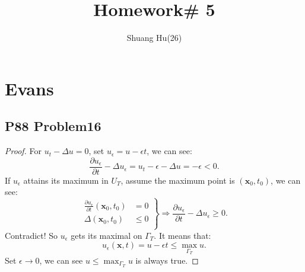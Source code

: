 \documentclass[a4paper]{ctexart}
\title{Homework\# 5}
\author{Shuang Hu(26)}
\newcommand{\pdfFrac}[2]{\frac{\partial #1}{\partial #2}}
\begin{document}
\maketitle
\section*{Evans}
\subsection*{P88 Problem16}
\begin{proof}
    For $u_{t}-\Delta u=0$, set $u_{\epsilon}=u-\epsilon t$, we can see:
    \begin{equation}
        \pdfFrac{u_{\epsilon}}{t}-\Delta u_{\epsilon}=u_{t}-\epsilon-\Delta u=-\epsilon<0.
    \end{equation}
    If $u_{\epsilon}$ attains its maximum in $U_{T}$, assume the maximum point is $(\mathbf{x}_{0},t_{0})$, we can see:
    \begin{equation}
        \left.
        \begin{aligned}
            \pdfFrac{u_{\epsilon}}{t}(\mathbf{x}_{0},t_{0})&=0\\
            \Delta(\mathbf{x}_{0},t_{0})&\le 0\\
        \end{aligned}
        \right\}
        \Rightarrow \pdfFrac{u_{\epsilon}}{t}-\Delta u_{\epsilon}\ge 0.
    \end{equation}
    Contradict! So $u_{\epsilon}$ gets its maximal on $\Gamma_{T}$. It means that:
    \begin{equation}
        u_{\epsilon}(\mathbf{x},t)=u-\epsilon t\le\max_{\Gamma_{T}}u.
    \end{equation}
    Set $\epsilon\rightarrow 0$, we can see $u\le\max_{\Gamma_{T}}u$ is always true.
\end{proof}
\end{document}
